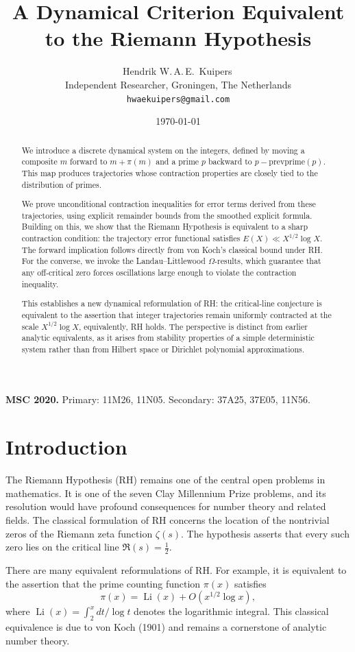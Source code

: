 \documentclass[11pt]{article}
\title{A Dynamical Criterion Equivalent to the Riemann Hypothesis}
\author{Hendrik W.\,A.\,E.\ Kuipers\,\orcidlink{0009-0002-7257-6378}\\
\small Independent Researcher, Groningen, The Netherlands\\
\small \texttt{hwaekuipers@gmail.com}}
\date{\today}
\theoremstyle{plain}
\theoremstyle{definition}
\theoremstyle{remark}
\begin{document}
\maketitle
\noindent \textbf{MSC 2020.} Primary: 11M26, 11N05. Secondary: 37A25, 37E05, 11N56.

\begin{abstract}
We introduce a discrete dynamical system on the integers, defined by moving a composite $m$ forward to $m+\pi(m)$ and a prime $p$ backward to $p-\mathrm{prevprime}(p)$. This map produces trajectories whose contraction properties are closely tied to the distribution of primes.

We prove unconditional contraction inequalities for error terms derived from these trajectories, using explicit remainder bounds from the smoothed explicit formula. Building on this, we show that the Riemann Hypothesis is equivalent to a sharp contraction condition: the trajectory error functional satisfies $E(X)\ll X^{1/2}\log X$. The forward implication follows directly from von Koch's classical bound under RH. For the converse, we invoke the Landau--Littlewood $\Omega$-results, which guarantee that any off-critical zero forces oscillations large enough to violate the contraction inequality.

This establishes a new dynamical reformulation of RH: the critical-line conjecture is equivalent to the assertion that integer trajectories remain uniformly contracted at the scale $X^{1/2}\log X$, equivalently, RH holds. The perspective is distinct from earlier analytic equivalents, as it arises from stability properties of a simple deterministic system rather than from Hilbert space or Dirichlet polynomial approximations.
\end{abstract}

\section{Introduction}

The Riemann Hypothesis (RH) remains one of the central open problems in mathematics. It is one of the seven Clay Millennium Prize problems, and its resolution would have profound consequences for number theory and related fields. The classical formulation of RH concerns the location of the nontrivial zeros of the Riemann zeta function $\zeta(s)$. The hypothesis asserts that every such zero lies on the critical line $\Re(s)=\tfrac{1}{2}$.

There are many equivalent reformulations of RH. For example, it is equivalent to the assertion that the prime counting function $\pi(x)$ satisfies
\[
\pi(x) = \operatorname{Li}(x) + O(x^{1/2}\log x),
\]
where $\operatorname{Li}(x)=\int_2^x dt/\log t$ denotes the logarithmic integral. This classical equivalence is due to von Koch (1901) and remains a cornerstone of analytic number theory.
\end{document}
